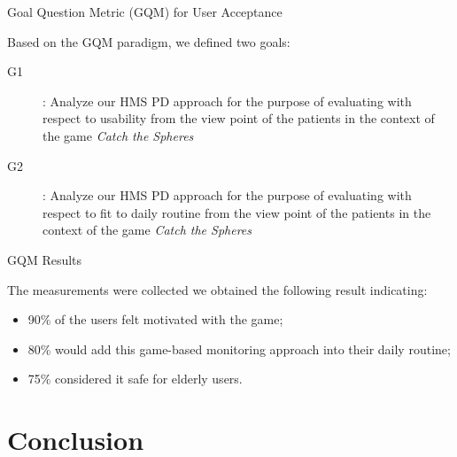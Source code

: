 \documentclass{beamer}
\begin{document}
\begin{frame}{Goal Question Metric (GQM) for User Acceptance}
	\begin{block}{}
	Based on the GQM paradigm, we defined two goals:
		\begin{description}
			\item [G1]: Analyze our HMS PD approach for the purpose of evaluating with respect to usability from the view point of the patients in the context of the game \emph{Catch the Spheres}
			\item [G2]: Analyze our HMS PD approach for the purpose of evaluating with respect to fit to daily routine from the view point of the patients in the context of the game \emph{Catch the Spheres}
		\end{description}
	\end{block}
\end{frame}


\begin{frame}{GQM Results}
	\begin{block}{}
	The measurements were collected we obtained the following result indicating:
		\begin{itemize}
			\item 90\% of the users felt motivated with the game;
			\item 80\% would add this game-based monitoring approach into their daily routine; 
			\item 75\% considered it safe for elderly users.
		\end{itemize}
	\end{block}
\end{frame}

\section{Conclusion}
\end{document}
